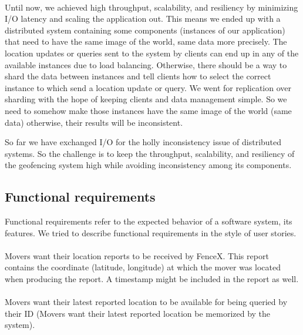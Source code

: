 \documentclass[a4]{report}
\begin{document}
    \paragraph{}
    Until now, we achieved high throughput, scalability, and resiliency by minimizing I/O latency and scaling the
    application out.
    This means we ended up with a distributed system containing some components (instances of our application) that
    need to have the same image of the world, same data more precisely.
    The location updates or queries sent to the system by clients can end up in any of the available instances due
    to load balancing.
    Otherwise, there should be a way to shard the data between instances and tell clients how to select the correct
    instance to which send a location update or query.
    We went for replication over sharding with the hope of keeping clients and data management simple.
    So we need to somehow make those instances have the same image of the world (same data) otherwise, their results will be inconsistent.

    So far we have exchanged I/O for the holly inconsistency issue of distributed systems.
    So the challenge is to keep the throughput, scalability, and resiliency of the geofencing system high while avoiding inconsistency among its components.

    \subsection{Functional requirements}
    Functional requirements refer to the expected behavior of a software system, its features.
    We tried to describe functional requirements in the style of user stories\cite{userStory}.

    \paragraph{}
    Movers want their location reports to be received by FenceX.
    This report contains the coordinate (latitude, longitude) at which the mover was located when producing the report.
    A timestamp might be included in the report as well.

    \paragraph{}
    Movers want their latest reported location to be available for being queried by their ID (Movers want their
    latest reported location be memorized by the system).
\end{document}
